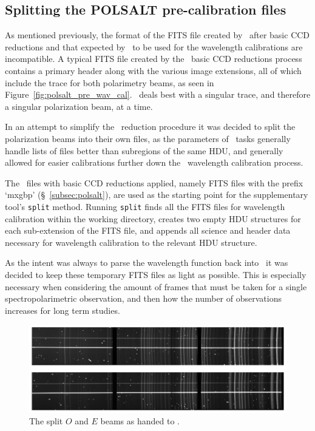 \subsection{Splitting the POLSALT pre-calibration files}

As mentioned previously, the format of the \gls{FITS} file created by \polsalt\ after basic \gls{CCD} reductions and that expected by \iraf\ to be used for the wavelength calibrations are incompatible. A typical \gls{FITS} file created by the \polsalt\ basic \gls{CCD} reductions process contains a primary header along with the various image extensions, all of which include the trace for both polarimetry beams, as seen in Figure~\ref{fig:polsalt_pre_wav_cal}. \iraf\ deals best with a singular trace, and therefore a singular polarization beam, at a time.
\prgph

In an attempt to simplify the \iraf\ reduction procedure it was decided to split the polarization beams into their own files, as the parameters of \iraf\ tasks generally handle lists of files better than subregions of the same \gls{HDU}, and generally allowed for easier calibrations further down the \iraf\ wavelength calibration process.
\prgph

The \polsalt\ files with basic \gls{CCD} reductions applied, namely \gls{FITS} files with the prefix `mxgbp' (\S~\ref{subsec:polsalt}), are used as the starting point for the supplementary tool's \texttt{split} method. Running \texttt{split} finds all the \gls{FITS} files for wavelength calibration within the working directory, creates two empty \gls{HDU} structures for each sub-extension of the \gls{FITS} file, and appends all science and header data necessary for wavelength calibration to the relevant \gls{HDU} structure.
\prgph

As the intent was always to parse the wavelength function back into \polsalt\ it was decided to keep these temporary \gls{FITS} files as light as possible. This is especially necessary when considering the amount of frames that must be taken for a single spectropolarimetric observation, and then how the number of observations increases for long term studies.
\prgph

\begin{figure}[t]
    \centering
    \includegraphics[width = 1.0\textwidth]{figures/3_OEsplit.pdf}
    \caption{The split $O$ and $E$ beams as handed to \iraf.}
    \label{fig:OE_split}
\end{figure}

